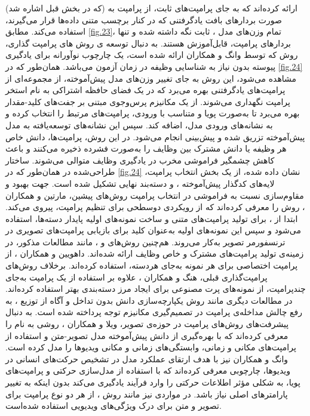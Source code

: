 (که در بخش قبل اشاره شد) ارائه کرده‌اند که به جای پرامپت‌های ثابت، از پرامپت به صورت بردارهای بافت یادگرفتنی
که در کنار برچسب متنی داده‌ها قرار می‌گیرند، استفاده می‌کند. مطابق 
\cref{fig.23}،
تمام وزن‌های مدل 
،
ثابت نگه داشته شده و تنها بردارهای پرامپت، قابل‌آموزش هستند. به دنبال توسعه ی روش های پرامپت گذاری، روش
که توسط وانگ و همکاران
\cite{l2p}
ارائه شده است، یک چارچوب نوآورانه برای یادگیری پیوسته بدون نیاز به شناسایی وظیفه در زمان آزمون می‌باشد. همان‌طور که در 
\cref{fig.24}
مشاهده می‌شود، این روش به جای تغییر وزن‌های مدل پیش‌آموخته، از مجموعه‌ای از پرامپت‌های یادگرفتنی بهره می‌برد که در یک فضای حافظه اشتراکی به نام استخر پرامپت
نگهداری می‌شوند. 
از یک مکانیزم پرس‌وجوی مبتنی بر جفت‌های کلید-مقدار بهره می‌برد تا به‌صورت پویا و متناسب با ورودی، پرامپت‌های مرتبط را انتخاب کرده و به نشانه‌‌های ورودی مدل، اضافه کند. سپس این نشانه‌‌های توسعه‌یافته به مدل پیش‌آموخته تزریق شده و پیش‌بینی انجام می‌شود.
در این روش، پرامپت‌ها، دانش خاص هر وظیفه یا دانش مشترک بین وظایف را به‌صورت فشرده ذخیره می‌کنند و باعث کاهش چشمگیر فراموشی مخرب در یادگیری وظایف متوالی می‌شوند. ساختار طراحی‌شده در  
همان‌طور که در 
\cref{fig.24}
نشان داده شده، از یک بخش انتخاب پرامپت، لایه‌های کدگذار پیش‌آموخته
،
و دسته‌بند نهایی تشکیل شده است. جهت بهبود و مقاوم‌سازی نسبت به فراموشی در انتخاب پرامپت روش‌های پیشین، مارتین و همکاران
\cite{starprompt}،
روش 
را معرفی کرده‌اند که از رویکردی دوسطحی برای تنظیم پرامپت، پیروی می‌کند. ابتدا از 
،
برای تولید پرامپت‌های متنی و ساخت نمونه‌های‌ اولیه
پایدار دسته‌ها، استفاده می‌شود و سپس این نمونه‌های اولیه به‌عنوان کلید برای بازیابی پرامپت‌های تصویری در ترنسفورمر تصویر به‌کار می‌روند. هم‌چنین روش‌های
\cite{dual-prompt}
و 
\cite{h-prompts}،
مانند مطالعات مذکور، در زمینه‌ی تولید پرامپت‌های مشترک و خاص وظایف ارائه شده‌اند. داهویین و همکاران
\cite{instance_prompt}،
از پرامپت اختصاصی برای هر نمونه به‌جای هر‌دسته، استفاده کرده‌اند. برخلاف روش‌های پرامپت‌گذاری قبلی، هنگ و همکاران
\cite{ovor}،
علاوه بر استفاده از یک پرامپت به‌جای چندپرامپت، از نمونه‌های پرت مصنوعی برای ایجاد مرز دسته‌بندی بهتر استفاده کرده‌اند. در مطالعات دیگری مانند روش یکپارچه‌سازی دانش بدون تداخل و آگاه از توزیع
\cite{diki}
،
به رفع چالش مداخله‌ی پرامپت در تصمیم‌گیری مکانیزم توجه پرداخته شده است. به دنبال پیشرفت‌های روش‌های پرامپت در حوزه‌ی تصویر، ویلا و همکاران
\cite{pivot}،
روشی به نام
را معرفی کرده‌اند که با بهره‌گیری از دانش پیش‌آموخته مدل‌ تصویر-متن
و استفاده از پرامپت‌های مکانی
و زمانی، وابستگی‌های زمانی و مکانی ویدیوها را مدل کرده است. وانگ و همکاران \cite{clip-poolprompt} نیز با هدف ارتقای عملکرد مدل  در تشخیص حرکت‌های انسانی در ویدیوها، چارچوبی معرفی کرده‌اند که با استفاده از مدل‌سازی حرکتی و پرامپت‌های پویا، به شکلی مؤثر اطلاعات حرکتی را وارد فرآیند یادگیری می‌کند بدون اینکه به تغییر پارامتر‌های اصلی  نیاز باشد. در مواردی نیز مانند روش  
\cite{vilt-clip}،
از هر دو نوع پرامپت برای تصویر و متن برای درک ویژگی‌های ویدیویی استفاده شده‌است.

